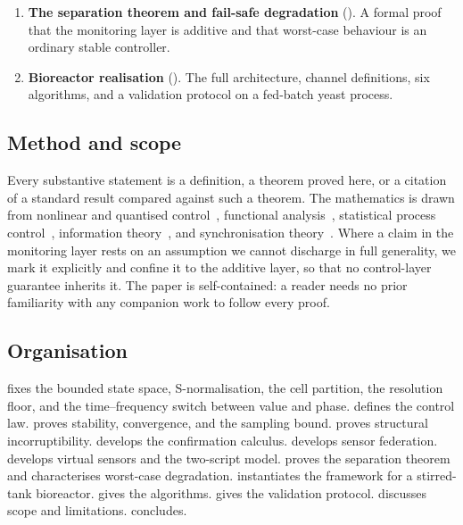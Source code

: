 \documentclass[11pt,a4paper,twocolumn]{article}
\theoremstyle{thmstyle}
\theoremstyle{definition}
\theoremstyle{remark}
\begin{document}
\begin{enumerate}[leftmargin=1.4em,itemsep=2pt]
phase that respects the cell partition, and a synthesis operation
(frequency-domain circular mean under mean-recovery, switched back to a
cell) that generates the value and the invariant of a computed channel
together.
\item \textbf{The separation theorem and fail-safe degradation}
(). A formal proof that the monitoring layer is
additive and that worst-case behaviour is an ordinary stable controller.
\item \textbf{Bioreactor realisation} ().
The full architecture, channel definitions, six algorithms, and a
validation protocol on a fed-batch yeast process.
\end{enumerate}

\subsection{Method and scope}

Every substantive statement is a definition, a theorem proved here, or a
citation of a standard result compared against such a theorem. The
mathematics is drawn from nonlinear and quantised
control~\citep{khalil2002nonlinear,brockett2000quantized},
functional analysis~\citep{kreyszig1989functional}, statistical process
control~\citep{page1954continuous,montgomery2020spc}, information
theory~\citep{shannon1948mathematical,cover2006elements}, and
synchronisation theory~\citep{kuramoto1984chemical,strogatz2000kuramoto}.
Where a claim in the monitoring layer rests on an assumption we cannot
discharge in full generality, we mark it explicitly and confine it to
the additive layer, so that no control-layer guarantee inherits it. The
paper is self-contained: a reader needs no prior familiarity with any
companion work to follow every proof.

\subsection{Organisation}

 fixes the bounded state space, S-normalisation,
the cell partition, the resolution floor, and the time--frequency switch
between value and phase.  defines the control law.  proves
stability, convergence, and the sampling bound. 
proves structural incorruptibility.  develops the
confirmation calculus.  develops sensor federation.
 develops virtual sensors and the two-script model.
 proves the separation theorem and characterises
worst-case degradation.  instantiates the framework
for a stirred-tank bioreactor.  gives the
algorithms.  gives the validation protocol.
 discusses scope and limitations.
 concludes.
\end{document}
